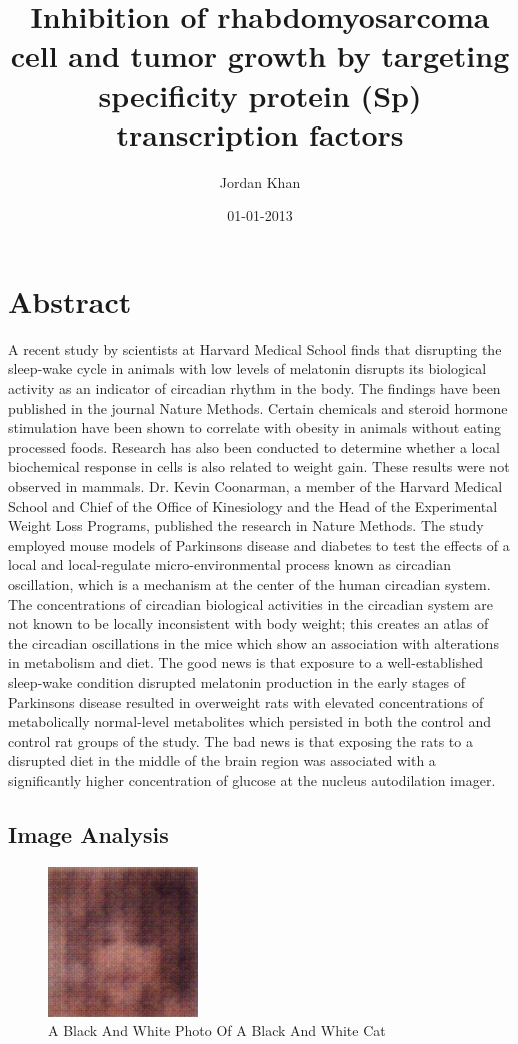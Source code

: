 \documentclass{article}%
\title{Inhibition of rhabdomyosarcoma cell and tumor growth by targeting specificity protein (Sp) transcription factors}%
\author{Jordan Khan}%
\affil{Discipline of Microbiology and Immunology, School of Molecular and Biomedical Science, University of Adelaide, Adelaide, Australia}%
\date{01{-}01{-}2013}%
\begin{document}
%
\normalsize%
\maketitle%
\section{Abstract}%
\label{sec:Abstract}%
A recent study by scientists at Harvard Medical School finds that disrupting the sleep{-}wake cycle in animals with low levels of melatonin disrupts its biological activity as an indicator of circadian rhythm in the body. The findings have been published in the journal Nature Methods.\newline%
Certain chemicals and steroid hormone stimulation have been shown to correlate with obesity in animals without eating processed foods. Research has also been conducted to determine whether a local biochemical response in cells is also related to weight gain. These results were not observed in mammals.\newline%
Dr. Kevin Coonarman, a member of the Harvard Medical School and Chief of the Office of Kinesiology and the Head of the Experimental Weight Loss Programs, published the research in Nature Methods.\newline%
The study employed mouse models of Parkinsons disease and diabetes to test the effects of a local and local{-}regulate micro{-}environmental process known as circadian oscillation, which is a mechanism at the center of the human circadian system. The concentrations of circadian biological activities in the circadian system are not known to be locally inconsistent with body weight; this creates an atlas of the circadian oscillations in the mice which show an association with alterations in metabolism and diet.\newline%
The good news is that exposure to a well{-}established sleep{-}wake condition  disrupted melatonin production  in the early stages of Parkinsons disease resulted in overweight rats with elevated concentrations of metabolically normal{-}level metabolites which persisted in both the control and control rat groups of the study. The bad news is that exposing the rats to a disrupted diet in the middle of the brain region was associated with a significantly higher concentration of glucose at the nucleus autodilation imager.

%
\subsection{Image Analysis}%
\label{subsec:ImageAnalysis}%


\begin{figure}[h!]%
\centering%
\includegraphics[width=150px]{500_fake_images/samples_5_13.png}%
\caption{A Black And White Photo Of A Black And White Cat}%
\end{figure}

%
\end{document}
